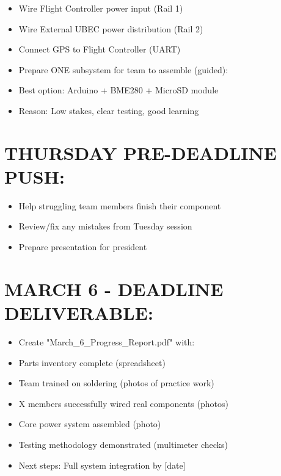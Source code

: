 \documentclass[11pt,letterpaper]{article}
\begin{document}
\begin{itemize}
  \item [WARNING]  [ ] Wire Flight Controller power input (Rail 1)
  \item [WARNING]  [ ] Wire External UBEC power distribution (Rail 2)
  \item [WARNING]  [ ] Connect GPS to Flight Controller (UART)
\end{itemize}

\begin{itemize}
  \item  [ ] Prepare ONE subsystem for team to assemble (guided):
  \item Best option: Arduino + BME280 + MicroSD module
  \item Reason: Low stakes, clear testing, good learning
\end{itemize}

\section{THURSDAY PRE-DEADLINE PUSH:}

\begin{itemize}
  \item  [ ] Help struggling team members finish their component
  \item  [ ] Review/fix any mistakes from Tuesday session
  \item  [ ] Prepare presentation for president
\end{itemize}

\section{MARCH 6 - DEADLINE DELIVERABLE:}

\begin{itemize}
  \item [CRITICAL] [ ] Create "March\_6\_Progress\_Report.pdf" with:
  \item Parts inventory complete (spreadsheet)
  \item Team trained on soldering (photos of practice work)
  \item X members successfully wired real components (photos)
  \item Core power system assembled (photo)
  \item Testing methodology demonstrated (multimeter checks)
  \item Next steps: Full system integration by [date]
\end{itemize}
\end{document}
